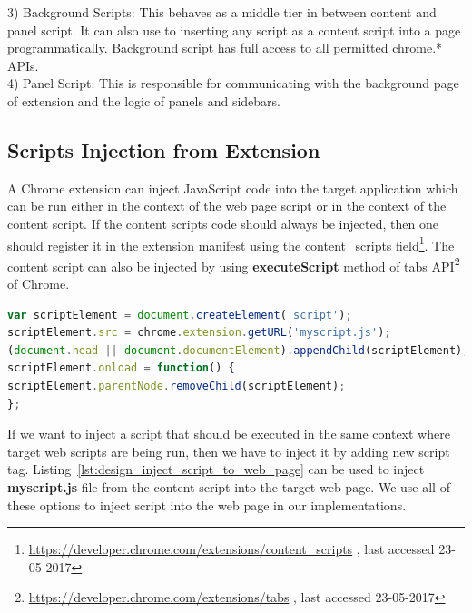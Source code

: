 3) Background Scripts: This behaves as a middle tier in between content and panel script. It can also use to inserting any script as a content script into a page programmatically. Background script has full access to all permitted chrome.* APIs.\\

4) Panel Script: This is responsible for communicating with the background page of extension and the logic of panels and sidebars.\\ 

\subsection{Scripts Injection from Extension}

A Chrome extension can inject JavaScript code into the target application which can be run either in the context of the web page script or in the context of the content script. If the content script\textquotesingle s code should always be injected, then one should register it in the extension manifest using the content\_scripts field\footnote{\url{https://developer.chrome.com/extensions/content_scripts} , last accessed 23-05-2017}.
The content script can also be injected by using \textbf{executeScript} method of tabs API\footnote{\url{https://developer.chrome.com/extensions/tabs} , last accessed 23-05-2017} of Chrome.

\begin{lstlisting}[language=JavaScript, caption=Injecting Script into Web Page Context, label={lst:design_inject_script_to_web_page}]
var scriptElement = document.createElement('script');
scriptElement.src = chrome.extension.getURL('myscript.js');
(document.head || document.documentElement).appendChild(scriptElement);
scriptElement.onload = function() {
scriptElement.parentNode.removeChild(scriptElement);
};
\end{lstlisting}

If we want to inject a script that should be executed in the same context where target web scripts are being run, then we have to inject it by adding new script tag. Listing~\ref{lst:design_inject_script_to_web_page} can be used to inject \textbf{myscript.js} file from the content script into the target web page. We use all of these options to inject script into the web page in our implementations.